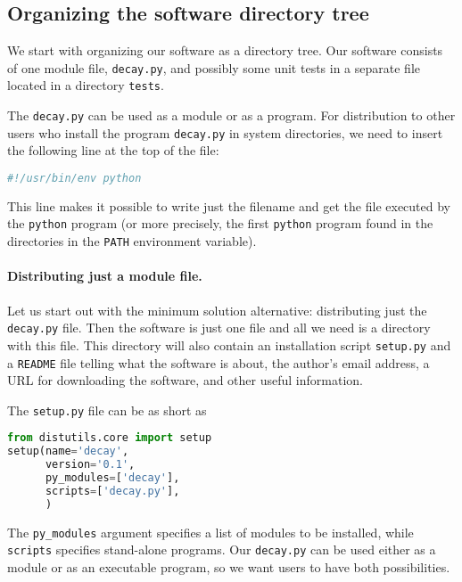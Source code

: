 \documentclass[graybox,sectrefs,envcountresetchap,open=right,final]{svmonodo}
\begin{document}
\noindent
\subsection{Organizing the software directory tree}

We start with organizing our software as a directory tree. Our
software consists of one module file, \texttt{decay.py}, and possibly some
unit tests in a separate file located in a directory \texttt{tests}.

The \texttt{decay.py} can be used as a module or as a program. For distribution
to other users who install the program \texttt{decay.py} in system directories,
we need to insert the following line at the top of the file:

\begin{lstlisting}[language=Python,style=blue1_bluegreen]
#!/usr/bin/env python
\end{lstlisting}
This line makes it possible to write just the filename and get the
file executed by the \texttt{python} program (or more precisely, the first
\texttt{python} program found in the directories in the \texttt{PATH} environment
variable).

\paragraph{Distributing just a module file.}
Let us start out with the minimum solution alternative: distributing
just the \texttt{decay.py} file. Then the software is just one file and all
we need is a directory with this file. This directory will also
contain an installation script \texttt{setup.py} and a \texttt{README} file
telling what the software is about, the author's email address, a URL
for downloading the software, and other useful information.


The \texttt{setup.py} file can be as short as

\begin{lstlisting}[language=Python,style=blue1bar_bluegreen]
from distutils.core import setup
setup(name='decay',
      version='0.1',
      py_modules=['decay'],
      scripts=['decay.py'],
      )
\end{lstlisting}
The \Verb!py_modules! argument specifies a list of modules to be installed, while
\texttt{scripts} specifies stand-alone programs. Our \texttt{decay.py} can be used
either as a module or as an executable program, so we want users to
have both possibilities.
\end{document}
